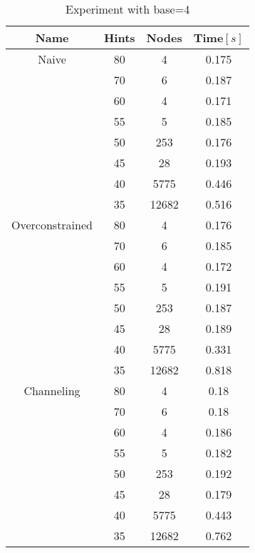 \documentclass[10pt,a4paper,oneside]{article}
\begin{document}
\begin{table}[H] 
\begin{center}
\begin{tabular}{||c|| c c c ||} 
  \hline
 Name & Hints & Nodes & Time$ \left[s\right] $ \\ [0.5ex] 
 \hline\hline
 Naive & 80 & 4 & 0.175  \\ 
 \hline
   & 70 & 6 & 0.187 \\ 
 \hline
   & 60 & 4 & 0.171 \\ 
 \hline
 	& 55 & 5 & 0.185 \\ 
 \hline
 	& 50 & 253 & 0.176 \\ 
 \hline
  	& 45 & 28 & 0.193 \\ 
 \hline
   	& 40 & 5775 & 0.446 \\ 
 \hline
    & 35 & 12682 & 0.516 \\ 
 \hline
 Overconstrained & 80 & 4 & 0.176  \\
 \hline
    & 70 & 6 & 0.185 \\ 
 \hline
   & 60 & 4 & 0.172 \\ 
 \hline
 	& 55 & 5 & 0.191 \\ 
 \hline
 	& 50 & 253 & 0.187 \\ 
 \hline
  	& 45 & 28 & 0.189 \\ 
 \hline
   	& 40 & 5775 & 0.331 \\ 
 \hline
    & 35 & 12682 & 0.818 \\ 
 \hline
 Channeling & 80 & 4 & 0.18  \\
 \hline
 	& 70 & 6 & 0.18  \\
 \hline
 	& 60 & 4 & 0.186  \\
 \hline
 	& 55 & 5 & 0.182  \\
 \hline
 	& 50 & 253 & 0.192  \\
 \hline
 	& 45 & 28 & 0.179  \\
 \hline
 	& 40 & 5775 & 0.443  \\
 \hline
 	& 35 & 12682 & 0.762  \\
 \hline

\end{tabular}
\end{center}
\caption{Experiment with base=4}
\end{table}
\end{document}
